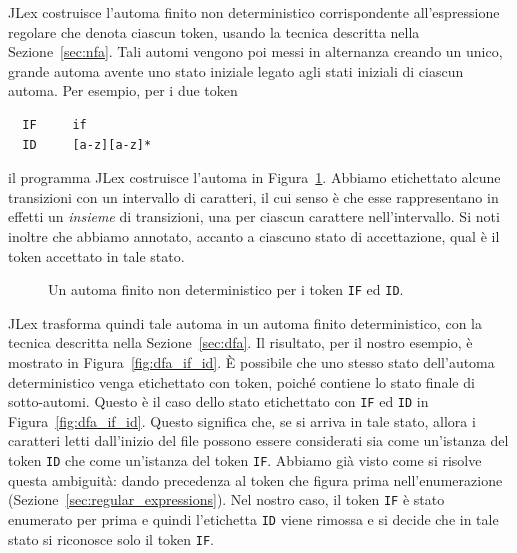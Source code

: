 JLex costruisce l'automa finito non deterministico corrispondente
all'espressione regolare che denota ciascun token, usando la tecnica
descritta nella Sezione~\ref{sec:nfa}. Tali automi vengono poi
messi in alternanza creando un unico, grande automa avente uno stato
iniziale legato agli stati iniziali di ciascun automa. Per esempio, per
i due token
%
\begin{verbatim}
  IF     if
  ID     [a-z][a-z]*
\end{verbatim}
%
il programma JLex costruisce l'automa
in Figura~\ref{fig:nfa_if_id}. Abbiamo etichettato alcune transizioni
con un intervallo di caratteri, il cui senso \`e che esse rappresentano in
effetti un \emph{insieme} di transizioni, una per ciascun carattere
nell'intervallo. Si noti inoltre che abbiamo annotato, accanto a
ciascuno stato di accettazione, qual \`e il token accettato in tale stato.
%
\begin{figure}[t]
\begin{center}
\end{center}
\caption{Un automa finito non deterministico per i token \texttt{IF} ed \texttt{ID}.}\label{fig:nfa_if_id}
\end{figure}
%
JLex trasforma quindi tale automa in un automa finito deterministico,
con la tecnica descritta nella Sezione~\ref{sec:dfa}. Il risultato, per il
nostro esempio, \`e mostrato in Figura~\ref{fig:dfa_if_id}.
\`E possibile che uno stesso stato dell'automa deterministico venga etichettato
con \piu token, poich\'e contiene lo stato finale di \piu sotto-automi.
Questo \`e il caso dello stato etichettato con \texttt{IF} ed \texttt{ID}
in Figura~\ref{fig:dfa_if_id}. Questo significa che, se si arriva in tale stato,
allora i caratteri letti dall'inizio del file possono essere considerati sia
come un'istanza del token \texttt{ID} che come un'istanza del token
\texttt{IF}. Abbiamo gi\`a visto come si risolve questa ambiguit\`a:
dando precedenza al token che figura prima nell'enumerazione
(Sezione~\ref{sec:regular_expressions}).
Nel nostro caso, il token \texttt{IF} \`e stato enumerato per prima e
quindi l'etichetta \texttt{ID} viene rimossa e si decide che in tale stato si riconosce
solo il token \texttt{IF}.

